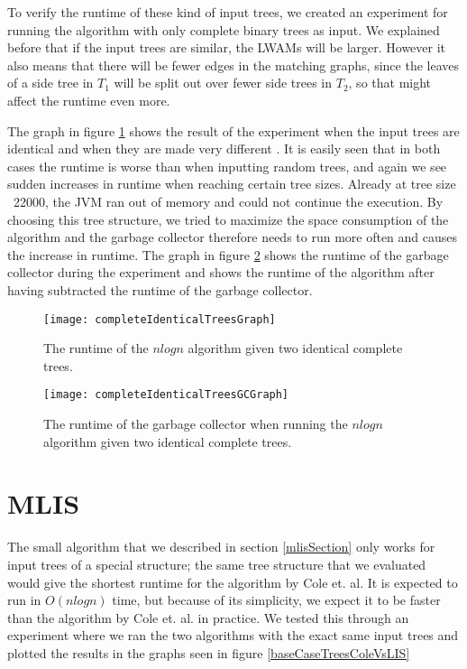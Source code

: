 To verify the runtime of these kind of input trees, we created an experiment for running the algorithm with only complete binary trees as input. We explained before that if the input trees are similar, the LWAMs will be larger. However it also means that there will be fewer edges in the matching graphs, since the leaves of a side tree in $T_1$ will be split out over fewer side trees in $T_2$, so that might affect the runtime even more.

The graph in figure \ref{completeIdenticalTreesGraph} shows the result of the experiment when the input trees are identical and when they are made very different .  It is easily seen that in both cases the runtime is worse than when inputting random trees, and again we see sudden increases in runtime when reaching certain tree sizes. Already at tree size ~22000, the JVM ran out of memory and could not continue the execution. 
By choosing this tree structure, we tried to maximize the space consumption of the algorithm and the garbage collector therefore needs to run more often and causes the increase in runtime. The graph in figure \ref{completeIdenticalTreesGCGraph} shows the runtime of the garbage collector during the experiment and  shows the runtime of the algorithm after having subtracted the runtime of the garbage collector. 

\begin{figure}
	\texttt{[image: completeIdenticalTreesGraph]}
	\caption{The runtime of the $nlogn$ algorithm given two identical complete trees.}
	\label{completeIdenticalTreesGraph}
\end{figure}

\begin{figure}
	\texttt{[image: completeIdenticalTreesGCGraph]}
	\caption{The runtime of the garbage collector when running the $nlogn$ algorithm given two identical complete trees.}
	\label{completeIdenticalTreesGCGraph}
\end{figure}



\section{MLIS}
The small algorithm that we described in section \ref{mlisSection} only works for input trees of a special structure; the same tree structure that we evaluated would give the shortest runtime for the algorithm by Cole et. al. It is expected to run in $O(nlogn)$ time, but because of its simplicity, we expect it to be faster than the algorithm by Cole et. al. in practice. We tested this through an experiment where we ran the two algorithms with the exact same input trees and plotted the results in the graphs seen in figure \ref{baseCaseTreesColeVsLIS}

